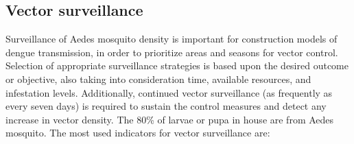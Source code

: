 \documentclass[review]{elsarticle}
\begin{document}
%
%

\subsection{Vector surveillance}

Surveillance of Aedes mosquito density is important for construction models of dengue transmission, in order to prioritize areas and seasons for vector control. Selection of appropriate surveillance strategies is based upon the desired outcome or objective, also taking into consideration time, available resources, and infestation levels. Additionally, continued vector surveillance (as frequently as every seven days) is required to sustain the control measures and detect any increase in vector density. The 80\% of larvae or pupa in house are from Aedes mosquito. The most used indicators for vector surveillance are:
\end{document}
